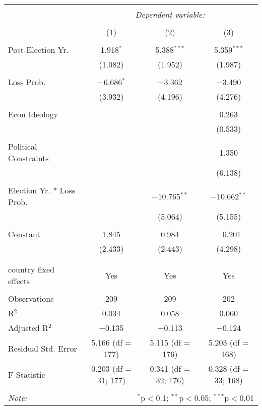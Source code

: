 
\begingroup 
\footnotesize 
\begin{tabular}{@{\extracolsep{5pt}}lccc} 
\\[-1.8ex]\hline 
\hline \\[-1.8ex] 
 & \multicolumn{3}{c}{\textit{Dependent variable:}} \\ 
\cline{2-4} 
\\[-1.8ex] & (1) & (2) & (3)\\ 
\hline \\[-1.8ex] 
 Post-Election Yr. & 1.918$^{*}$ & 5.388$^{***}$ & 5.359$^{***}$ \\ 
  & (1.082) & (1.952) & (1.987) \\ 
  & & & \\ 
 Loss Prob. & $-$6.686$^{*}$ & $-$3.362 & $-$3.490 \\ 
  & (3.932) & (4.196) & (4.276) \\ 
  & & & \\ 
 Econ Ideology &  &  & 0.263 \\ 
  &  &  & (0.533) \\ 
  & & & \\ 
 Political Constraints &  &  & 1.350 \\ 
  &  &  & (6.138) \\ 
  & & & \\ 
 Election Yr. * Loss Prob. &  & $-$10.765$^{**}$ & $-$10.662$^{**}$ \\ 
  &  & (5.064) & (5.155) \\ 
  & & & \\ 
 Constant & 1.845 & 0.984 & $-$0.201 \\ 
  & (2.433) & (2.443) & (4.298) \\ 
  & & & \\ 
\hline \\[-1.8ex] 
country fixed effects & Yes & Yes & Yes \\ 
\hline \\[-1.8ex] 
Observations & 209 & 209 & 202 \\ 
R$^{2}$ & 0.034 & 0.058 & 0.060 \\ 
Adjusted R$^{2}$ & $-$0.135 & $-$0.113 & $-$0.124 \\ 
Residual Std. Error & 5.166 (df = 177) & 5.115 (df = 176) & 5.203 (df = 168) \\ 
F Statistic & 0.203 (df = 31; 177) & 0.341 (df = 32; 176) & 0.328 (df = 33; 168) \\ 
\hline 
\hline \\[-1.8ex] 
\textit{Note:}  & \multicolumn{3}{r}{$^{*}$p$<$0.1; $^{**}$p$<$0.05; $^{***}$p$<$0.01} \\ 
\end{tabular} 
\endgroup 

